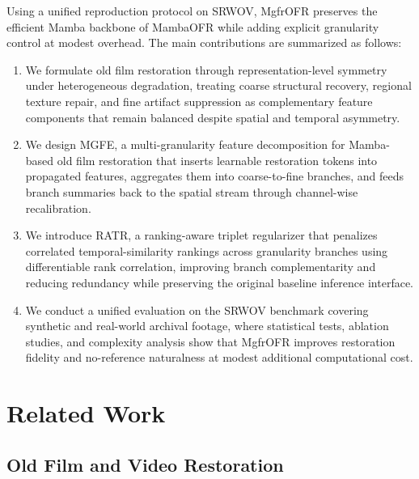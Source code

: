 Using a unified reproduction protocol on SRWOV, MgfrOFR preserves the efficient Mamba backbone of MambaOFR while adding explicit granularity control at modest overhead. The main contributions are summarized as follows:
\begin{enumerate}
    \item We formulate old film restoration through representation-level symmetry under heterogeneous degradation, treating coarse structural recovery, regional texture repair, and fine artifact suppression as complementary feature components that remain balanced despite spatial and temporal asymmetry.
    \item We design MGFE, a multi-granularity feature decomposition for Mamba-based old film restoration that inserts learnable restoration tokens into propagated features, aggregates them into coarse-to-fine branches, and feeds branch summaries back to the spatial stream through channel-wise recalibration.
    \item We introduce RATR, a ranking-aware triplet regularizer that penalizes correlated temporal-similarity rankings across granularity branches using differentiable rank correlation, improving branch complementarity and reducing redundancy while preserving the original baseline inference interface.
    \item We conduct a unified evaluation on the SRWOV benchmark covering synthetic and real-world archival footage, where statistical tests, ablation studies, and complexity analysis show that MgfrOFR improves restoration fidelity and no-reference naturalness at modest additional computational cost.
\end{enumerate}
\section{Related Work}
\label{sec:related}

\subsection{Old Film and Video Restoration}
\label{subsec:ofr}

